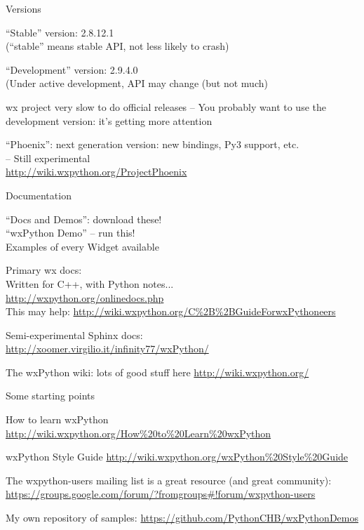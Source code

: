 \documentclass{beamer}
\begin{document}
\begin{frame}[fragile]{Versions}

\vfill
{\Large ``Stable'' version: 2.8.12.1}\\
{\large (``stable'' means stable API, not less likely to crash)}

\vfill
{\Large ``Development'' version: 2.9.4.0}\\
{\large (Under active development, API may change (but not much)}

\vfill
{\Large wx project very slow to do official releases -- You probably want to use the development version: it's getting more attention}

\vfill
{\Large ``Phoenix'': next generation version: new bindings, Py3 support, etc.}\\
{\large -- Still experimental}\\
\url{http://wiki.wxpython.org/ProjectPhoenix}

\end{frame}

\begin{frame}[fragile]{Documentation}

\vfill
{\Large ``Docs and Demos'': download these!}\\

\vfill
{\Large ``wxPython Demo'' -- run this!}\\
{\large Examples of every Widget available}

\vfill
{\Large Primary wx docs:}\\
{\large Written for C++, with Python notes...}\\
\url{http://wxpython.org/onlinedocs.php}\\
This may help: \url{http://wiki.wxpython.org/C%2B%2BGuideForwxPythoneers}

\vfill
{\large Semi-experimental Sphinx docs:}\\
\url{http://xoomer.virgilio.it/infinity77/wxPython/}

\vfill
{\Large The wxPython wiki: lots of good stuff here}
\url{http://wiki.wxpython.org/}

\end{frame}

\begin{frame}[fragile]{Some starting points}


\vfill
{\Large How to learn wxPython}
\url{http://wiki.wxpython.org/How%20to%20Learn%20wxPython}

\vfill
{\Large wxPython Style Guide}
\url{http://wiki.wxpython.org/wxPython%20Style%20Guide}

\vfill
{\Large The wxpython-users mailing list is a great resource (and great community):}\\
\url{https://groups.google.com/forum/?fromgroups#!forum/wxpython-users}

\vfill
{\large My own repository of samples:}
\url{https://github.com/PythonCHB/wxPythonDemos}

\end{frame}
\end{document}
